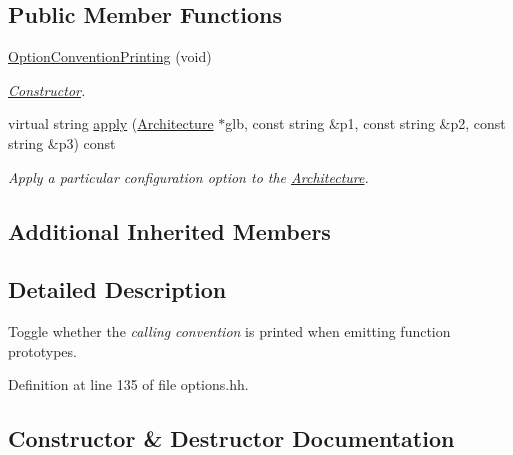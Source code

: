 \subsection*{Public Member Functions}
\begin{DoxyCompactItemize}
\item 
\mbox{\hyperlink{class_option_convention_printing_ad662d7c46f5e6e440d0ddc101881bad2}{Option\+Convention\+Printing}} (void)
\begin{DoxyCompactList}\small\item\em \mbox{\hyperlink{class_constructor}{Constructor}}. \end{DoxyCompactList}\item 
virtual string \mbox{\hyperlink{class_option_convention_printing_a9f28fa77231c615d59e6357fece32f7d}{apply}} (\mbox{\hyperlink{class_architecture}{Architecture}} $\ast$glb, const string \&p1, const string \&p2, const string \&p3) const
\begin{DoxyCompactList}\small\item\em Apply a particular configuration option to the \mbox{\hyperlink{class_architecture}{Architecture}}. \end{DoxyCompactList}\end{DoxyCompactItemize}
\subsection*{Additional Inherited Members}


\subsection{Detailed Description}
Toggle whether the {\itshape calling} {\itshape convention} is printed when emitting function prototypes. 

Definition at line 135 of file options.\+hh.



\subsection{Constructor \& Destructor Documentation}
\mbox{\label{class_option_convention_printing_ad662d7c46f5e6e440d0ddc101881bad2}} 
